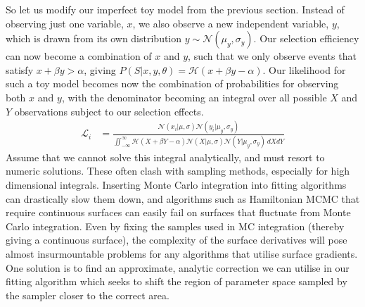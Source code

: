 \documentclass[a4paper,fleqn,usenatbib]{mnras}
\begin{document}
So let us modify our imperfect toy model from the previous section. Instead of observing just one variable, $x$, we also observe a new independent variable, $y$, which is drawn from its own distribution $y \sim \mathcal{N}(\mu_y, \sigma_y)$. Our selection efficiency can now become a combination of $x$ and $y$, such that we only observe events that satisfy $x + \beta y > \alpha$, giving $P(S|x,y,\theta) = \mathcal{H}(x + \beta y - \alpha)$.  Our likelihood for such a toy model becomes now the combination of probabilities for observing both $x$ and $y$, with the denominator becoming an integral over all possible $X$ and $Y$ observations subject to our selection effects.
\begin{align}
\mathcal{L}_i &= \frac{ \mathcal{N}(x_i|\mu, \sigma) \mathcal{N}(y_i|\mu_y, \sigma_y)}
{\iint_{-\infty}^\infty \mathcal{H}(X + \beta Y - \alpha) \mathcal{N}(X|\mu, \sigma) \mathcal{N}(Y|\mu_y, \sigma_y)\, dX dY}
\end{align}
Assume that we cannot solve this integral analytically, and must resort to numeric solutions. These often clash with sampling methods, especially for high dimensional integrals. Inserting Monte Carlo integration into fitting algorithms can drastically slow them down, and algorithms such as Hamiltonian MCMC that require continuous surfaces can easily fail on surfaces that fluctuate from Monte Carlo integration. Even by fixing the samples used in MC integration (thereby giving a continuous surface), the complexity of the surface derivatives will pose almost insurmountable problems for any algorithms that utilise surface gradients. One solution is to find an approximate, analytic correction we can utilise in our fitting algorithm which seeks to shift the region of parameter space sampled by the sampler closer to the correct area.
\end{document}
